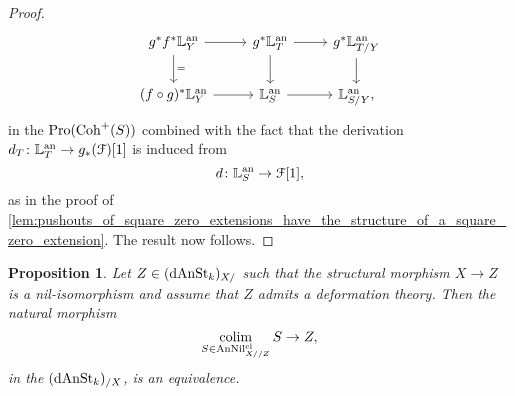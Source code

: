 \documentclass[10pt,a4paper,reqno]{amsart} %
\theoremstyle{plain}
\newtheorem{prop}[thm]{Proposition}
\theoremstyle{definition}
\theoremstyle{remark}
\numberwithin{equation}{section}
\begin{document}
\begin{proof}
        \[
        \begin{tikzcd}    
            g^* f^*\bbL\an_Y \ar{r} \ar{d}{=} & g^* \bbL\an_{T} \ar{r} \ar{d} &  g^* \bbL\an_{T/Y} \ar{d} \\
            (f\circ g)^*\bbL\an_Y \ar{r} & \bbL\an_{S} \ar{r} & \bbL\an_{S/Y},
        \end{tikzcd}
        \]
    in the \infcat $\mathrm{Pro}(\mathrm{Coh}^+(S))$ combined with the fact that the derivation $d_T \colon \mathbb L^\mathrm{an}_T \to g_*(\mathcal F)[1]$ is induced from
        \[
            d \colon \mathbb L^\mathrm{an}_S \to \mathcal F[1],
        \]
    as in the proof of \cref{lem:pushouts_of_square_zero_extensions_have_the_structure_of_a_square_zero_extension}. The result now follows.
\end{proof}

\begin{prop} \label{prop:stacks_under_X_with_deformation_theory_are_analytic_FMP}
    Let $Z \in (\mathrm{dAnSt}_k)_{X/ }$ such that the structural morphism $X \to Z$ is a nil-isomorphism and assume that
    $Z$ admits a deformation theory. Then the natural morphism
        \[
            \operatorname*{colim}_{S \in \mathrm{AnNil}_{X/ /Z}^{\mathrm{cl}}} S \to Z,  
        \]
    in the \infcat $(\mathrm{dAnSt}_k)_{/X}$, is an equivalence.
\end{prop}
\end{document}
